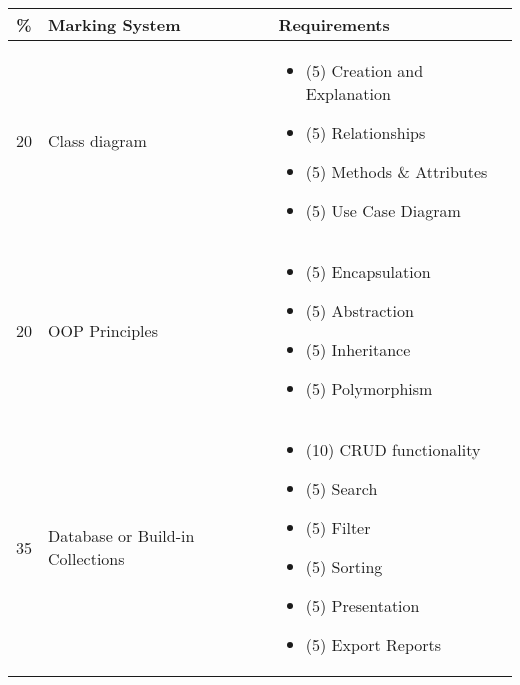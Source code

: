 \documentclass{article}
\begin{document}
\begin{tabular}{|c|l|p{10cm}|}


\hline


\textbf{\%} & \textbf{Marking System} & \textbf{Requirements} \\


\hline


20 & Class diagram & \begin{itemize}


    \item (5) Creation and Explanation


    \item (5) Relationships


    \item (5) Methods \& Attributes


    \item (5) Use Case Diagram


\end{itemize} \\


\hline


20 & OOP Principles & \begin{itemize}


    \item (5) Encapsulation


    \item (5) Abstraction


    \item (5) Inheritance


    \item (5) Polymorphism


\end{itemize} \\


\hline


35 & Database or Build-in Collections & \begin{itemize}


    \item (10) CRUD functionality


    \item (5) Search


    \item (5) Filter


    \item (5) Sorting


    \item (5) Presentation


    \item (5) Export Reports



\end{itemize}
\end{tabular}
\end{document}
